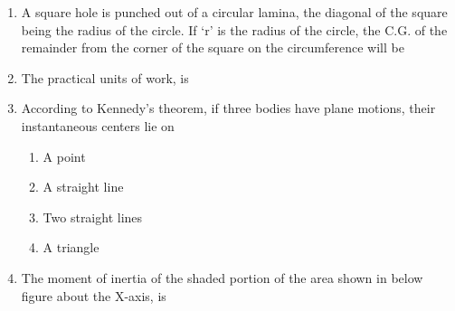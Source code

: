 \documentclass[11pt,a4paper]{article}
\begin{document}
\begin{enumerate}
\begin{enumerate}[label=\Alph*.]
\end{enumerate}
\item{A square hole is punched out of a circular lamina, the diagonal of the square being the radius of the circle. If `r' is the radius of the circle, the C.G. of the remainder from the corner of the square on the circumference will be
}
\\
\item{The practical units of work, is}
\\
\item{According to Kennedy's theorem, if three bodies have plane motions, their instantaneous centers lie on}
\begin{enumerate}[label=\Alph*.]
\item{A point}
\item{A straight line}
\item{Two straight lines}
\item{A triangle}
\end{enumerate}
\item{The moment of inertia of the shaded portion of the area shown in below figure about the X-axis, is \\

}
\end{enumerate}
\end{document}
